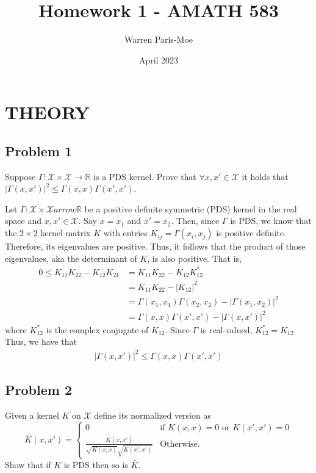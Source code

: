 \documentclass[12pt]{article}
\title{Homework 1 - AMATH 583}
\author{Warren Paris-Moe}
\date{April 2023}
\begin{document}
\section*{THEORY}

\subsection*{Problem 1}
\begin{mdframed}
    Suppose $\Gamma: \mathcal{X} \times \mathcal{X} \to \mathbb{R}$ is a PDS kernel. 
    Prove that $\forall x, x' \in \mathcal{X}$ it holds that
    $|\Gamma(x, x')|^2 \leq \Gamma(x, x) \Gamma(x', x')$.
\end{mdframed}

Let $\Gamma:\mathcal{X}\times\mathcal{X}arrow\mathbb{R}$ be a positive definite symmetric (PDS)
kernel in the real space and $x,x' \in \mathcal{X}$. Say $x=x_1$ and $x'=x_2$. Then, since $\Gamma$ 
is PDS, we know that the $2 \times 2$ kernel matrix $K$ with entries $K_{ij} = \Gamma(x_i, x_j)$ is 
positive definite. Therefore, its eigenvalues are positive. Thus, it follows that the product of 
those eigenvalues, aka the determinant of $K$, is also positive. That is,
\begin{align*}
    0 \leq K_{11}K_{22} - K_{12}K_{21} &= K_{11}K_{22} - K_{12}K_{12}^* \\
    &= K_{11}K_{22} - |K_{12}|^2 \\
    &= \Gamma(x_1, x_1)\Gamma(x_2, x_2) - |\Gamma(x_1, x_2)|^2 \\
    &= \Gamma(x, x)\Gamma(x', x') - |\Gamma(x, x')|^2
\end{align*}
where $K_{12}^*$ is the complex conjugate of $K_{12}$. Since $\Gamma$ is real-valued,
$K_{12}^* = K_{12}$. Thus, we have that 
\begin{align}
    |\Gamma(x, x')|^2 \leq \Gamma(x, x)\Gamma(x', x')
\end{align}


\subsection*{Problem 2} %
\begin{mdframed}
    Given a kernel $K$ on $\mathcal{X}$ define its normalized version as
    \[
    \bar{K}(x,x') = 
        \begin{cases}
            0 & \text{if } K(x,x)=0 \text{ or } K(x', x')=0 \\ 
            \frac{K(x, x')}{\sqrt{K(x, x)} \sqrt{K(x', x')}} & \text{Otherwise.} 
        \end{cases}
    \]
    Show that if $K$ is PDS then so is $\bar{K}$.
\end{mdframed}
\end{document}
